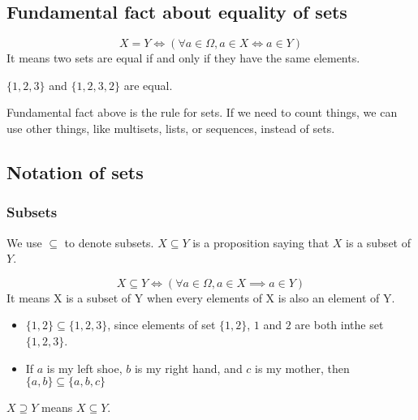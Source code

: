 \documentclass[a4paper]{article}
\begin{document}
\subsection{Fundamental fact about equality of sets}

\begin{defi}
\[
	X = Y \iff (\forall a \in \Omega, a \in X \iff a \in Y)
\]
It means two sets are equal if and only if they have the same elements.
\end{defi}

\begin{eg}
$\{ 1, 2, 3 \}$ and $\{ 1, 2, 3, 2 \}$ are equal.
\end{eg}

Fundamental fact above is the rule for sets. If we need to count things, we can use other things, like multisets, lists, or sequences, instead of sets.

\subsection{Notation of sets}

\subsubsection{Subsets}
\begin{notation}
We use $\subseteq$ to denote subsets. $X \subseteq Y$ is a proposition saying that $X$ is a subset of $Y$.
\end{notation}

\begin{defi}[Subset]
\[
	X \subseteq Y \iff (\forall a \in \Omega, a \in X \implies a \in Y)
\]
It means X is a subset of Y when every elements of X is also an element of Y.
\end{defi}

\begin{eg}\leavevmode
	\begin{itemize}
		\item $\{ 1, 2 \} \subseteq \{ 1, 2, 3 \}$, since elements of set $\{ 1, 2\}$, $1$ and $2$ are both inthe set $\{ 1, 2, 3 \}$.
		\item If $a$ is my left shoe, $b$ is my right hand, and $c$ is my mother, then $\{ a, b \} \subseteq \{ a, b, c \}$
	\end{itemize}
\end{eg}

\begin{notation}
$X \supseteq Y$ means $X \subseteq Y$.
\end{notation}
\end{document}
